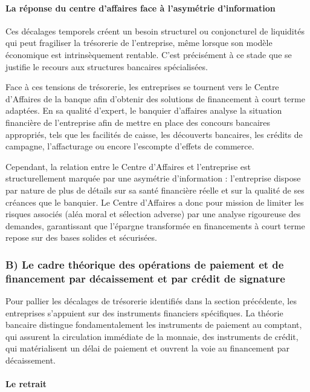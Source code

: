 \paragraph{La réponse du centre d'affaires face à l'asymétrie d'information}

Ces décalages temporels créent un besoin structurel ou conjoncturel de liquidités qui peut fragiliser la trésorerie de l'entreprise, même lorsque son modèle économique est intrinsèquement rentable. C'est précisément à ce stade que se justifie le recours aux structures bancaires spécialisées.

Face à ces tensions de trésorerie, les entreprises se tournent vers le Centre d'Affaires de la banque afin d'obtenir des solutions de financement à court terme adaptées. En sa qualité d'expert, le banquier d'affaires analyse la situation financière de l'entreprise afin de mettre en place des concours bancaires appropriés, tels que les facilités de caisse, les découverts bancaires, les crédits de campagne, l'affacturage ou encore l'escompte d'effets de commerce.

Cependant, la relation entre le Centre d'Affaires et l'entreprise est structurellement marquée par une asymétrie d'information : l'entreprise dispose par nature de plus de détails sur sa santé financière réelle et sur la qualité de ses créances que le banquier. Le Centre d'Affaires a donc pour mission de limiter les risques associés (aléa moral et sélection adverse) par une analyse rigoureuse des demandes, garantissant que l'épargne transformée en financements à court terme repose sur des bases solides et sécurisées.

\subsubsection*{B) Le cadre théorique des opérations de paiement et de financement par décaissement et par crédit de signature}

Pour pallier les décalages de trésorerie identifiés dans la section précédente, les entreprises s'appuient sur des instruments financiers spécifiques. La théorie bancaire distingue fondamentalement les instruments de paiement au comptant, qui assurent la circulation immédiate de la monnaie, des instruments de crédit, qui matérialisent un délai de paiement et ouvrent la voie au financement par décaissement.

\paragraph{Le retrait}

